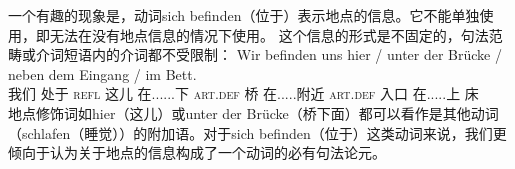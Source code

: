 一个有趣的现象是，动词sich befinden（位于）表示地点的信息。它不能单独使用，即无法在没有地点信息的情况下使用。
\z
这个信息的形式是不固定的，句法范畴或介词短语内的介词都不受限制：
\ea
\gll Wir befinden uns hier / unter der Brücke / neben dem Eingang / im Bett.\\
	 我们 处于 \textsc{refl} 这儿 {} 在......下 \textsc{art}.\textsc{def} 桥 {} 在.....附近 \textsc{art}.\textsc{def} 入口 {} 在.....上 床\\
\z
地点修饰词如hier（这儿）或unter der Brücke（桥下面）都可以看作是其他动词（\egc schlafen（睡觉））的附加语。对于sich befinden（位于）这类动词来说，我们更倾向于认为关于地点的信息构成了一个动词的必有句法论元。
%
%

